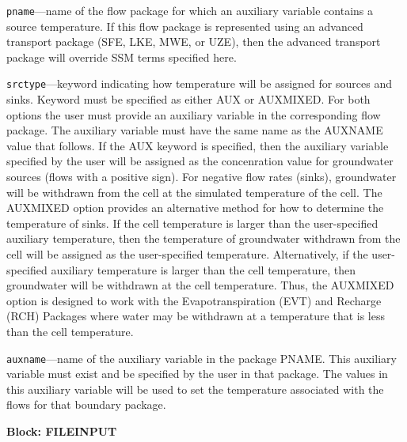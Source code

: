 \begin{description}
\item \texttt{pname}---name of the flow package for which an auxiliary variable contains a source temperature.  If this flow package is represented using an advanced transport package (SFE, LKE, MWE, or UZE), then the advanced transport package will override SSM terms specified here.

\item \texttt{srctype}---keyword indicating how temperature will be assigned for sources and sinks.  Keyword must be specified as either AUX or AUXMIXED.  For both options the user must provide an auxiliary variable in the corresponding flow package.  The auxiliary variable must have the same name as the AUXNAME value that follows.  If the AUX keyword is specified, then the auxiliary variable specified by the user will be assigned as the concenration value for groundwater sources (flows with a positive sign).  For negative flow rates (sinks), groundwater will be withdrawn from the cell at the simulated temperature of the cell.  The AUXMIXED option provides an alternative method for how to determine the temperature of sinks.  If the cell temperature is larger than the user-specified auxiliary temperature, then the temperature of groundwater withdrawn from the cell will be assigned as the user-specified temperature.  Alternatively, if the user-specified auxiliary temperature is larger than the cell temperature, then groundwater will be withdrawn at the cell temperature.  Thus, the AUXMIXED option is designed to work with the Evapotranspiration (EVT) and Recharge (RCH) Packages where water may be withdrawn at a temperature that is less than the cell temperature.

\item \texttt{auxname}---name of the auxiliary variable in the package PNAME.  This auxiliary variable must exist and be specified by the user in that package.  The values in this auxiliary variable will be used to set the temperature associated with the flows for that boundary package.

\end{description}
\item \textbf{Block: FILEINPUT}

